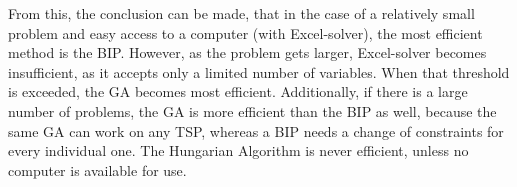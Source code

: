 \vspace{5mm}

From this, the conclusion can be made, that in the case of a relatively small problem and easy access to a computer (with Excel-solver), the most efficient method is the BIP. However, as the problem gets larger, Excel-solver becomes insufficient, as it accepts only a limited number of variables. When that threshold is exceeded, the GA becomes most efficient. Additionally, if there is a large number of problems, the GA is more efficient than the BIP as well, because the same GA can work on any TSP, whereas a BIP needs a change of constraints for every individual one. The Hungarian Algorithm is never efficient, unless no computer is available for use.